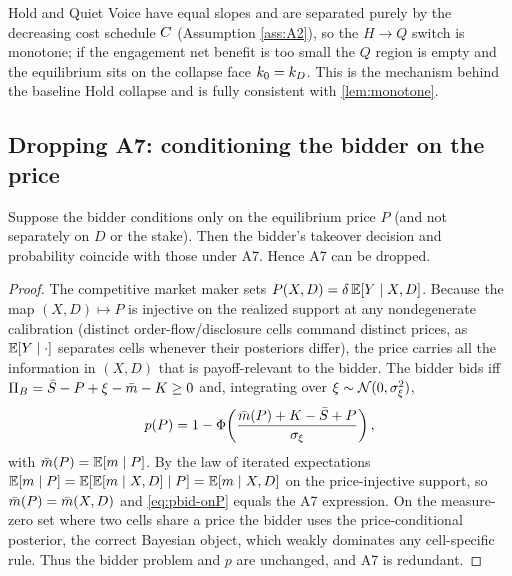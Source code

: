 \begin{remark}[Why the tie $B(H)=B(Q)$ is benign]
\label{rem:tie}
Hold and Quiet Voice have equal slopes and are separated purely by the decreasing
cost schedule $C$ (Assumption \ref{ass:A2}), so the $H\!\to\!Q$ switch is
monotone; if the engagement net benefit is too small the $Q$ region is empty and
the equilibrium sits on the collapse face $k_0=k_D$. This is the mechanism
behind the baseline Hold collapse and is fully consistent with
\ref{lem:monotone}.
\end{remark}

\subsection{Dropping A7: conditioning the bidder on the price}
\label{ssub:dropA7}

\begin{lemma}
\label{lem:dropA7}
Suppose the bidder conditions only on the equilibrium price $P$ (and not
separately on $D$ or the stake). Then the bidder's takeover decision and
probability coincide with those under A7. Hence A7 can be dropped.
\end{lemma}

\begin{proof}
The competitive market maker sets $P(X,D)=\delta\,\mathbb{E}[Y\mid X,D]$. Because the
map $(X,D)\mapsto P$ is injective on the realized support at any nondegenerate
calibration (distinct order-flow/disclosure cells command distinct prices, as
$\mathbb{E}[Y\mid\cdot]$ separates cells whenever their posteriors differ), the price
carries all the information in $(X,D)$ that is payoff-relevant to the bidder. The
bidder bids iff $\Pi_B=\bar{S}-P+\xi-\bar{m}-K\ge0$ and, integrating over
$\xi\sim\mathcal N(0,\sigma_\xi^2)$,
\begin{equation}
\label{eq:pbid-onP}
p(P)=1-\Phi\!\left(\frac{\bar{m}(P)+K-\bar{S}+P}{\sigma_\xi}\right),
\end{equation}
with $\bar{m}(P)=\mathbb{E}[m\mid P]$. By the law of iterated expectations
$\mathbb{E}[m\mid P]=\mathbb{E}[\mathbb{E}[m\mid X,D]\mid P]=\mathbb{E}[m\mid X,D]$ on the price-injective
support, so $\bar{m}(P)=\bar{m}(X,D)$ and \eqref{eq:pbid-onP} equals the A7
expression. On the measure-zero set where two cells share a price the bidder uses
the price-conditional posterior, the correct Bayesian object, which weakly
dominates any cell-specific rule. Thus the bidder problem and $p$ are unchanged,
and A7 is redundant.
\end{proof}

